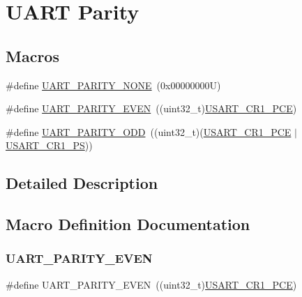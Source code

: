 \hypertarget{group___u_a_r_t___parity}{}\section{U\+A\+RT Parity}
\label{group___u_a_r_t___parity}
\subsection*{Macros}
\begin{DoxyCompactItemize}
\item 
\#define \hyperlink{group___u_a_r_t___parity_ga270dea6e1a92dd83fe58802450bdd60c}{U\+A\+R\+T\+\_\+\+P\+A\+R\+I\+T\+Y\+\_\+\+N\+O\+NE}~(0x00000000\+U)
\item 
\#define \hyperlink{group___u_a_r_t___parity_ga063b14ac42ef9e8f4246c17a586b14eb}{U\+A\+R\+T\+\_\+\+P\+A\+R\+I\+T\+Y\+\_\+\+E\+V\+EN}~((uint32\+\_\+t)\hyperlink{group___peripheral___registers___bits___definition_ga60f8fcf084f9a8514efafb617c70b074}{U\+S\+A\+R\+T\+\_\+\+C\+R1\+\_\+\+P\+CE})
\item 
\#define \hyperlink{group___u_a_r_t___parity_ga229615e64964f68f7a856ea6ffea359e}{U\+A\+R\+T\+\_\+\+P\+A\+R\+I\+T\+Y\+\_\+\+O\+DD}~((uint32\+\_\+t)(\hyperlink{group___peripheral___registers___bits___definition_ga60f8fcf084f9a8514efafb617c70b074}{U\+S\+A\+R\+T\+\_\+\+C\+R1\+\_\+\+P\+CE} $\vert$ \hyperlink{group___peripheral___registers___bits___definition_ga2e159d36ab2c93a2c1942df60e9eebbe}{U\+S\+A\+R\+T\+\_\+\+C\+R1\+\_\+\+PS}))
\end{DoxyCompactItemize}


\subsection{Detailed Description}


\subsection{Macro Definition Documentation}
\mbox{\label{group___u_a_r_t___parity_ga063b14ac42ef9e8f4246c17a586b14eb}} 
\subsubsection{\texorpdfstring{U\+A\+R\+T\+\_\+\+P\+A\+R\+I\+T\+Y\+\_\+\+E\+V\+EN}{UART\_PARITY\_EVEN}}
{\footnotesize\ttfamily \#define U\+A\+R\+T\+\_\+\+P\+A\+R\+I\+T\+Y\+\_\+\+E\+V\+EN~((uint32\+\_\+t)\hyperlink{group___peripheral___registers___bits___definition_ga60f8fcf084f9a8514efafb617c70b074}{U\+S\+A\+R\+T\+\_\+\+C\+R1\+\_\+\+P\+CE})}

